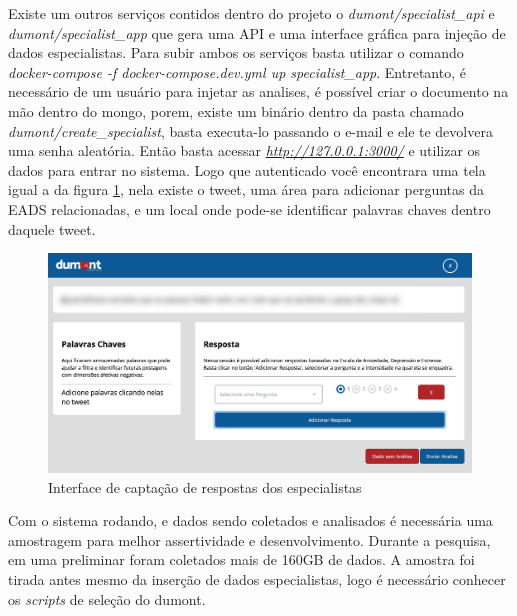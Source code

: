 Existe um outros serviços contidos dentro do projeto o \textit{dumont/specialist\_api} e \textit{dumont/specialist\_app} que gera uma API e uma interface gráfica para injeção de dados especialistas. Para subir ambos os serviços basta utilizar o comando \textit{docker-compose -f docker-compose.dev.yml up specialist\_app}. Entretanto, é necessário de um usuário para injetar as analises, é possível criar o documento na mão dentro do mongo, porem, existe um binário dentro da pasta chamado \textit{dumont/create\_specialist}, basta executa-lo passando o e-mail e ele te devolvera uma senha aleatória. Então basta acessar \textit{\url{http://127.0.0.1:3000/}} e utilizar os dados para entrar no sistema. Logo que autenticado você encontrara uma tela igual a da figura \ref{fig:specialist}, nela existe o tweet, uma área para adicionar perguntas da EADS relacionadas, e um local onde pode-se identificar palavras chaves dentro daquele tweet.

\begin{figure}
    \centering
    \includegraphics[width=1\textwidth]{imagens/specialist.png}
    \caption{Interface de captação de respostas dos especialistas}
    \label{fig:specialist}
\end{figure}

Com o sistema rodando, e dados sendo coletados e analisados é necessária uma amostragem para melhor assertividade e desenvolvimento. Durante a pesquisa, em uma preliminar foram coletados mais de 160GB de dados. A amostra foi tirada antes mesmo da inserção de dados especialistas, logo é necessário conhecer os \textit{scripts} de seleção do dumont.
